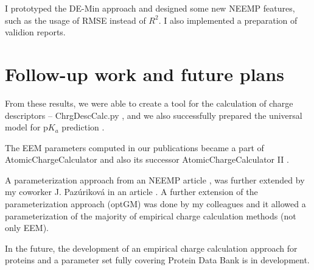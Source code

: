 I prototyped the DE-Min approach and designed some new NEEMP features, such as
the usage of RMSE instead of $R^2$. I also implemented a preparation of validion
reports.

\chapter{Follow-up work and future plans}

From these results, we were able to create a tool for the calculation
of charge descriptors -- ChrgDescCalc.py \cite{Hejret2015}, and we also
successfully prepared the universal model for p$K_a$ prediction \cite{Hejret2017}.

The EEM parameters computed in our publications \cite{Geidl2015_eem, Racek2016}
became a part of AtomicChargeCalculator \cite{Ionescu2015} and also its successor 
AtomicChargeCalculator II \cite{Racek2020}.

A parameterization approach from an NEEMP article \cite{Racek2016}, was further
extended by my coworker J. Pazúriková in an article \cite{Pazurikova2016}.
A further extension of the parameterization approach
(optGM) was done by my colleagues \cite{Schindler2021} and it allowed a parameterization
of the majority of empirical charge calculation methods (not only EEM).

In the future, the development of an empirical charge calculation approach
for proteins and a parameter set fully covering Protein Data Bank is
in development.

